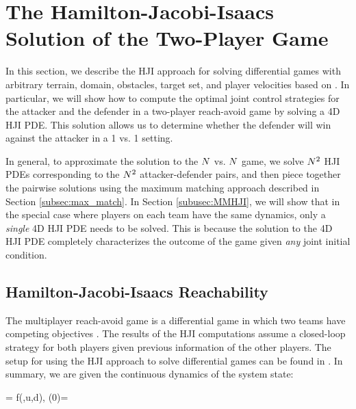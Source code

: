 \section{The Hamilton-Jacobi-Isaacs Solution of the Two-Player Game} \label{sec:solution_hji}
In this section, we describe the HJI approach for solving differential games with arbitrary terrain, domain, obstacles, target set, and player velocities based on \cite{Huang2011,j:mitchell-TAC-2005, LSToolbox}. In particular, we will show how to compute the optimal joint control strategies for the attacker and the defender in a two-player reach-avoid game by solving a 4D HJI PDE. This solution allows us to determine whether the defender will win against the attacker in a 1 vs. 1 setting. 

In general, to approximate the solution to the $N$ vs. $N$ game, we solve $N^2$ HJI PDEs corresponding to the $N^2$ attacker-defender pairs, and then piece together the pairwise solutions using the maximum matching approach described in Section \ref{subsec:max_match}. In Section \ref{subusec:MMHJI}, we will show that in the special case where players on each team have the same dynamics,  only a \textit{single} 4D HJI PDE needs to be solved. This is because the solution to the 4D HJI PDE completely characterizes the outcome of the game given \textit{any} joint initial condition.

\subsection{Hamilton-Jacobi-Isaacs Reachability} \label{subsec:hj_background}
The multiplayer reach-avoid game is a differential game in which two teams have competing objectives \cite{b:basar-olsder-1999}. The results of the HJI computations assume a closed-loop strategy for both players given previous information of the other players. The setup for using the HJI approach to solve differential games can be found in \cite{Huang2011, j:mitchell-TAC-2005, LSToolbox}. In summary, we are given the continuous dynamics of the system state:

\bq
\dxj = f(\xj,u,d), \xj(0)=\xjn
\eq

